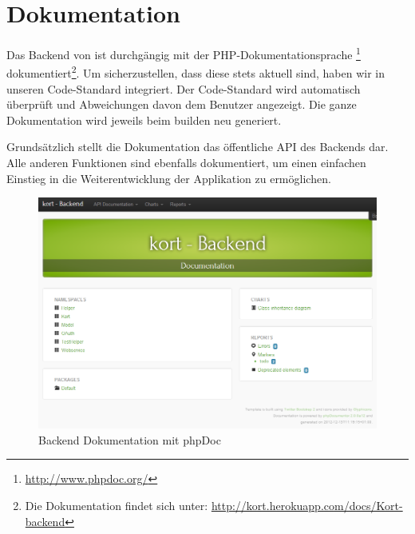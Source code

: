 \section{Dokumentation}
\label{backend-dokumentation}

Das Backend von \kort{} ist durchgängig mit der PHP-Dokumentationsprache \footnote{\url{http://www.phpdoc.org/}} dokumentiert\footnote{Die Dokumentation findet sich unter: \url{http://kort.herokuapp.com/docs/Kort-backend}}.
Um sicherzustellen, dass diese stets aktuell sind, haben wir  in unseren Code-Standard integriert.
Der Code-Standard wird automatisch überprüft und Abweichungen davon dem Benutzer angezeigt.
Die ganze Dokumentation wird jeweils beim builden neu generiert.

Grundsätzlich stellt die Dokumentation das öffentliche \gls{API} des Backends dar.
Alle anderen Funktionen sind ebenfalls dokumentiert, um einen einfachen Einstieg in die Weiterentwicklung der Applikation zu ermöglichen.

\begin{figure}[H]
	\centering
	\includegraphics[width=\textwidth]{images/implementation/backend/kort-backend-documentation}
	\caption{\kort{} Backend Dokumentation mit phpDoc}
	\label{image-kort-backend-documentation}
\end{figure}